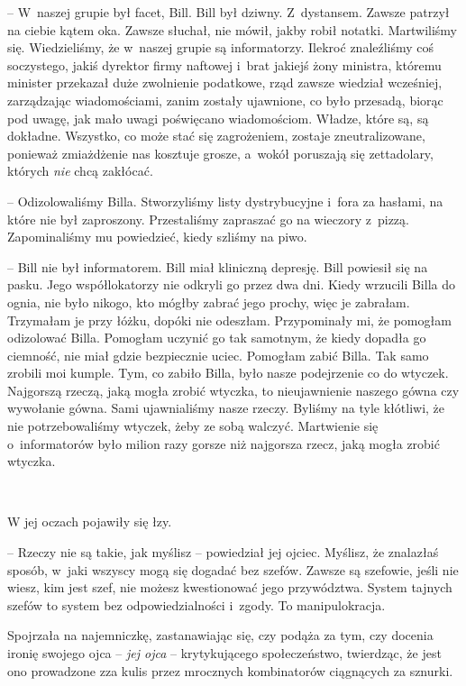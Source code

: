 \documentclass[oneside,polish,11pt,sfheadings]{mwbk}
\begin{document}
-- W~naszej grupie był facet, Bill. Bill był dziwny. Z~dystansem. Zawsze
patrzył na ciebie kątem oka. Zawsze słuchał, nie mówił, jakby robił
notatki. Martwiliśmy się. Wiedzieliśmy, że w~naszej grupie są
informatorzy. Ilekroć znaleźliśmy coś soczystego, jakiś dyrektor firmy
naftowej i~brat jakiejś żony ministra, któremu minister przekazał duże
zwolnienie podatkowe, rząd zawsze wiedział wcześniej, zarządzając
wiadomościami, zanim zostały ujawnione, co było przesadą, biorąc pod
uwagę, jak mało uwagi poświęcano wiadomościom. Władze, które są, są
dokładne. Wszystko, co może stać się zagrożeniem, zostaje
zneutralizowane, ponieważ zmiażdżenie nas kosztuje grosze, a~wokół
poruszają się zettadolary, których \textit{nie} chcą zakłócać.

-- Odizolowaliśmy Billa. Stworzyliśmy listy dystrybucyjne i~fora za
hasłami, na które nie był zaproszony. Przestaliśmy zapraszać go na
wieczory z~pizzą. Zapominaliśmy mu powiedzieć, kiedy szliśmy na piwo.

-- Bill nie był informatorem. Bill miał kliniczną depresję. Bill powiesił
się na pasku. Jego współlokatorzy nie odkryli go przez dwa dni. Kiedy
wrzucili Billa do ognia, nie było nikogo, kto mógłby zabrać jego prochy,
więc je zabrałam. Trzymałam je przy łóżku, dopóki nie odeszłam.
Przypominały mi, że pomogłam odizolować Billa. Pomogłam uczynić go tak
samotnym, że kiedy dopadła go ciemność, nie miał gdzie bezpiecznie
uciec. Pomogłam zabić Billa. Tak samo zrobili moi kumple. Tym, co zabiło
Billa, było nasze podejrzenie co do wtyczek. Najgorszą rzeczą, jaką
mogła zrobić wtyczka, to nieujawnienie naszego gówna czy wywołanie
gówna. Sami ujawnialiśmy nasze rzeczy. Byliśmy na tyle kłótliwi, że nie
potrzebowaliśmy wtyczek, żeby ze sobą walczyć. Martwienie się o~informatorów było milion razy gorsze niż najgorsza rzecz, jaką mogła
zrobić wtyczka.

~

W jej oczach pojawiły się łzy.

-- Rzeczy nie są takie, jak myślisz -- powiedział jej ojciec. Myślisz, że
znalazłaś sposób, w~jaki wszyscy mogą się dogadać bez szefów. Zawsze są
szefowie, jeśli nie wiesz, kim jest szef, nie możesz kwestionować jego
przywództwa. System tajnych szefów to system bez odpowiedzialności i~zgody. To manipulokracja.

Spojrzała na najemniczkę, zastanawiając się, czy podąża za tym, czy
docenia ironię swojego ojca -- \textit{jej ojca }-- krytykującego
społeczeństwo, twierdząc, że jest ono prowadzone zza kulis przez
mrocznych kombinatorów ciągnących za sznurki.
\end{document}
